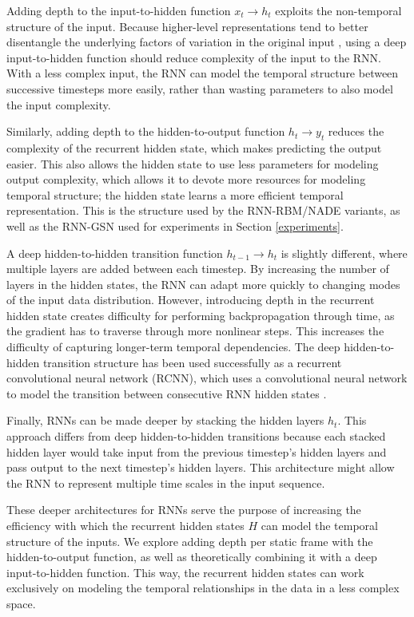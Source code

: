 Adding depth to the input-to-hidden function \(x_t \rightarrow h_t\) exploits the non-temporal structure of the input. Because higher-level representations tend to better disentangle the underlying factors of variation in the original input \cite{bengio13}, using a deep input-to-hidden function should reduce complexity of the input to the RNN. With a less complex input, the RNN can model the temporal structure between successive timesteps more easily, rather than wasting parameters to also model the input complexity.

Similarly, adding depth to the hidden-to-output function \(h_t \rightarrow y_t\) reduces the complexity of the recurrent hidden state, which makes predicting the output easier. This also allows the hidden state to use less parameters for modeling output complexity, which allows it to devote more resources for modeling temporal structure; the hidden state learns a more efficient temporal representation. This is the structure used by the RNN-RBM/NADE variants, as well as the RNN-GSN used for experiments in Section \ref{experiments}.

A deep hidden-to-hidden transition function \(h_{t-1} \rightarrow h_t\) is slightly different, where multiple layers are added between each timestep. By increasing the number of layers in the hidden states, the RNN can adapt more quickly to changing modes of the input data distribution. However, introducing depth in the recurrent hidden state creates difficulty for performing backpropagation through time, as the gradient has to traverse through more nonlinear steps. This increases the difficulty of capturing longer-term temporal dependencies. The deep hidden-to-hidden transition structure has been used successfully as a recurrent convolutional neural network (RCNN), which uses a convolutional neural network to model the transition between consecutive RNN hidden states \cite{rcnn}.

Finally, RNNs can be made deeper by stacking the hidden layers \(h_t\). This approach differs from deep hidden-to-hidden transitions because each stacked hidden layer would take input from the previous timestep's hidden layers and pass output to the next timestep's hidden layers. This architecture might allow the RNN to represent multiple time scales in the input sequence.

These deeper architectures for RNNs serve the purpose of increasing the efficiency with which the recurrent hidden states $H$ can model the temporal structure of the inputs. We explore adding depth per static frame with the hidden-to-output function, as well as theoretically combining it with a deep input-to-hidden function. This way, the recurrent hidden states can work exclusively on modeling the temporal relationships in the data in a less complex space.